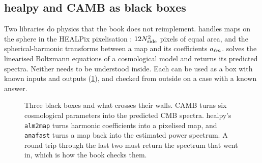\subsection{healpy and CAMB as black boxes}
\label{T0a:sec:blackbox}

Two libraries do physics that the book does not reimplement.  handles maps on the sphere in the HEALPix pixelisation \cite{Gorski2005}: $12N_{\rm side}^2$ pixels of equal area, and the spherical-harmonic transforms between a map and its coefficients $a_{\ell m}$.  \cite{CAMB2000} solves the linearised Boltzmann equations of a cosmological model and returns its predicted spectra. Neither needs to be understood inside. Each can be used as a box with known inputs and outputs (\cref{T0a:fig:blackbox}), and checked from outside on a case with a known answer.

\begin{figure}[htbp]
\centering
{}
\caption{Three black boxes and what crosses their walls. CAMB turns six cosmological parameters into the predicted CMB spectra. healpy's \texttt{alm2map} turns harmonic coefficients into a pixelised map, and \texttt{anafast} turns a map back into the estimated power spectrum. A round trip through the last two must return the spectrum that went in, which is how the book checks them.}
\label{T0a:fig:blackbox}
\end{figure}

